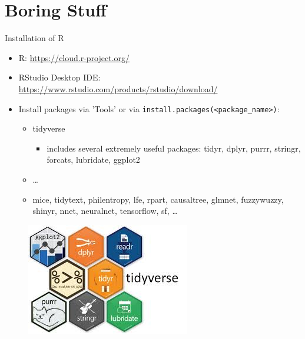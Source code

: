 \documentclass[12pt,aspectratio=169]{beamer}
\begin{document}
\section{Boring Stuff}
\begin{frame}{Installation of R}
\begin{itemize}
    \item R: \url{https://cloud.r-project.org/}
    \item RStudio Desktop IDE: \url{https://www.rstudio.com/products/rstudio/download/}
    \item Install packages via 'Tools' or via \texttt{install.packages(<package\_name>)}:
    \begin{itemize}
    \item tidyverse
    \begin{itemize}
        \item includes several extremely useful packages: tidyr, dplyr, purrr, stringr, forcats, lubridate, ggplot2
    \end{itemize}
    \item  \dots
    \item mice, tidytext, philentropy, lfe, rpart, causaltree, glmnet, fuzzywuzzy, shinyr, nnet, neuralnet, tensorflow, sf, \dots
    \end{itemize}
\end{itemize}
\begin{figure}
\centering
\includegraphics[width=1.0\linewidth,height=0.3\textheight,keepaspectratio]{resources/tidyverse-2.jpeg}
\end{figure}
\end{frame}
\end{document}
